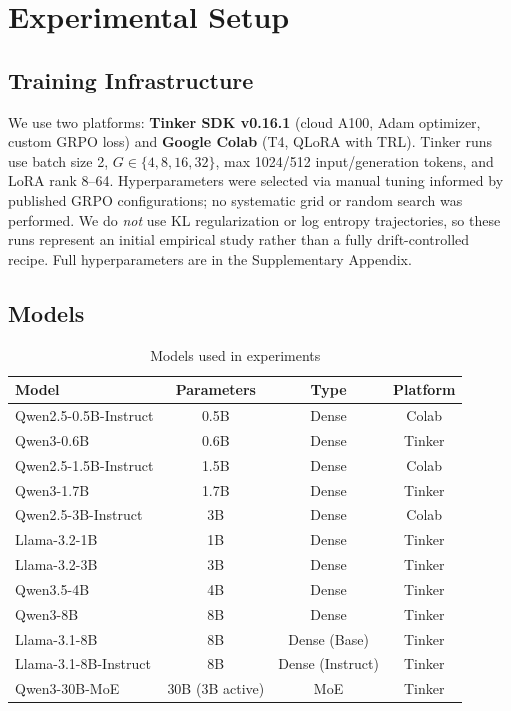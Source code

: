\documentclass{article}
\begin{document}
\section{Experimental Setup}
\label{sec:experimental_setup}

\subsection{Training Infrastructure}

We use two platforms: \textbf{Tinker SDK v0.16.1} (cloud A100, Adam optimizer, custom GRPO loss) and \textbf{Google Colab} (T4, QLoRA with TRL). Tinker runs use batch size 2, $G \in \{4, 8, 16, 32\}$, max 1024/512 input/generation tokens, and LoRA rank 8--64. Hyperparameters were selected via manual tuning informed by published GRPO configurations; no systematic grid or random search was performed. We do \emph{not} use KL regularization or log entropy trajectories, so these runs represent an initial empirical study rather than a fully drift-controlled recipe. Full hyperparameters are in the Supplementary Appendix.

\subsection{Models}

\begin{table}[htbp]
    \centering
    \caption{Models used in experiments}
    \begin{tabular}{lccc}
        \toprule
        Model & Parameters & Type & Platform \\
        \midrule
        Qwen2.5-0.5B-Instruct & 0.5B & Dense & Colab \\
        Qwen3-0.6B & 0.6B & Dense & Tinker \\
        Qwen2.5-1.5B-Instruct & 1.5B & Dense & Colab \\
        Qwen3-1.7B & 1.7B & Dense & Tinker \\
        Qwen2.5-3B-Instruct & 3B & Dense & Colab \\
        Llama-3.2-1B & 1B & Dense & Tinker \\
        Llama-3.2-3B & 3B & Dense & Tinker \\
        Qwen3.5-4B & 4B & Dense & Tinker \\
        Qwen3-8B & 8B & Dense & Tinker \\
        Llama-3.1-8B & 8B & Dense (Base) & Tinker \\
        Llama-3.1-8B-Instruct & 8B & Dense (Instruct) & Tinker \\
        Qwen3-30B-MoE & 30B (3B active) & MoE & Tinker \\
        \bottomrule
    \end{tabular}
    \label{tab:models}
\end{table}
\end{document}
